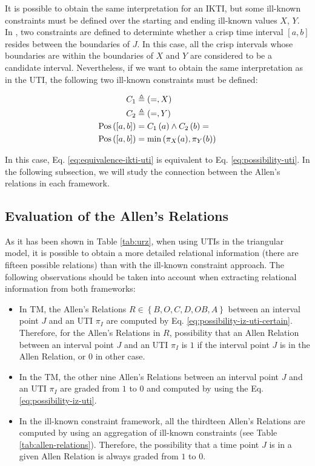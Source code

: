 It is possible to obtain the same interpretation for an IKTI, but some ill-known constraints must be defined over the starting and ending ill-known values $X$, $Y$. In \cite{Pons2011}, two constraints are defined to determinte whether a crisp time interval $[a, b]$ resides between the boundaries of $J$. In this case, all the crisp intervals whose boundaries are within the boundaries of $X$ and $Y$ are considered to be a candidate interval. Nevertheless, if we want to obtain the same interpretation as in the UTI, the following two ill-known constraints must be defined:

\begin{align}
 \label{eq:ikc-ikti-uti}
C_1 &\triangleq \left(=, X \right) \\
C_2 &\triangleq \left(=, Y \right)\\
\operatorname{Pos} \left(\left[a, b\right] \right) &= C_1 \left(a \right) \wedge C_2\left(b \right) =\\
\label{eq:equivalence-ikti-uti}
\operatorname{Pos} \left(\left[a, b\right] \right) &= \min \left( \pi_X(a), \pi_Y(b) \right)
\end{align}

In this case, Eq. \eqref{eq:equivalence-ikti-uti} is equivalent to Eq. \eqref{eq:possibility-uti}.
In the following subsection, we will study the connection between the Allen's relations in each framework.

\subsection{\label{subsec:eval-allen-relations}Evaluation of the Allen's Relations}
As it has been shown in Table \ref{tab:urz}, when using UTIs in the triangular model, it is possible to obtain a more detailed relational information (there are fifteen possible relations) than with the ill-known constraint approach. The following observations should be taken into account when extracting relational information from both frameworks:

\begin{itemize}
 \item In TM, the Allen's Relations $R \in \left \lbrace B, O, C, D, OB, A \right \rbrace$ between an interval point $J$  and an UTI $\pi_I$ are computed by Eq. \eqref{eq:possibility-iz-uti-certain}. Therefore, for the Allen's Relations in $R$, 
 possibility that an Allen Relation between an interval point $J$  and an UTI $\pi_I$ is $1$ if the interval point $J$ is in the Allen Relation, or $0$ in other case.
\item In the TM, the other nine Allen's Relations between an interval point $J$ and an UTI $\pi_I$ are graded from $1$ to $0$ and computed by using the Eq. \eqref{eq:possibility-iz-uti}. 
\item In the ill-known constraint framework, all the thirdteen Allen's Relations are computed by using an aggregation of ill-known constraints (see Table \ref{tab:allen-relations}). Therefore, the possibility that a time point $J$ is in a given Allen Relation is always graded from $1$ to $0$.
\end{itemize}

